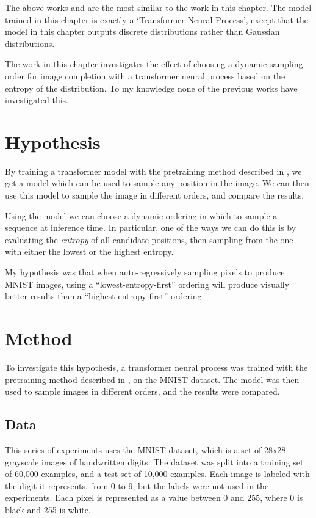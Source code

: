 The above works \cite{transformer-neural-processes} and  \cite{transformers-bayesian} are the most similar to the work in this chapter. The model trained in this chapter is exactly a `Transformer Neural Process', except that the model in this chapter outputs discrete distributions rather than Gaussian distributions.

The work in this chapter investigates the effect of choosing a dynamic sampling order for image completion with a transformer neural process based on the entropy of the distribution. To my knowledge none of the previous works have investigated this.

\section{Hypothesis}
\label{s:a-o-hypotheses}

By training a transformer model with the pretraining method described in , we get a model which can be used to sample any position in the image. We can then use this model to sample the image in different orders, and compare the results.

Using the model we can choose a dynamic ordering in which to sample a sequence at inference time. In particular, one of the ways we can do this is by evaluating the \textit{entropy} of all candidate positions, then sampling from the one with either the lowest or the highest entropy.

My hypothesis was that when auto-regressively sampling pixels to produce MNIST images, using a ``lowest-entropy-first'' ordering will produce visually better results than a ``highest-entropy-first'' ordering.

\section{Method}

To investigate this hypothesis, a transformer neural process was trained with the pretraining method described in , on the MNIST dataset. The model was then used to sample images in different orders, and the results were compared.

\subsection{Data}

This series of experiments uses the MNIST dataset, which is a set of 28x28 grayscale images of handwritten digits. The dataset was split into a training set of 60,000 examples, and a test set of 10,000 examples. Each image is labeled with the digit it represents, from 0 to 9, but the labels were not used in the experiments. Each pixel is represented as a value between 0 and 255, where 0 is black and 255 is white.


